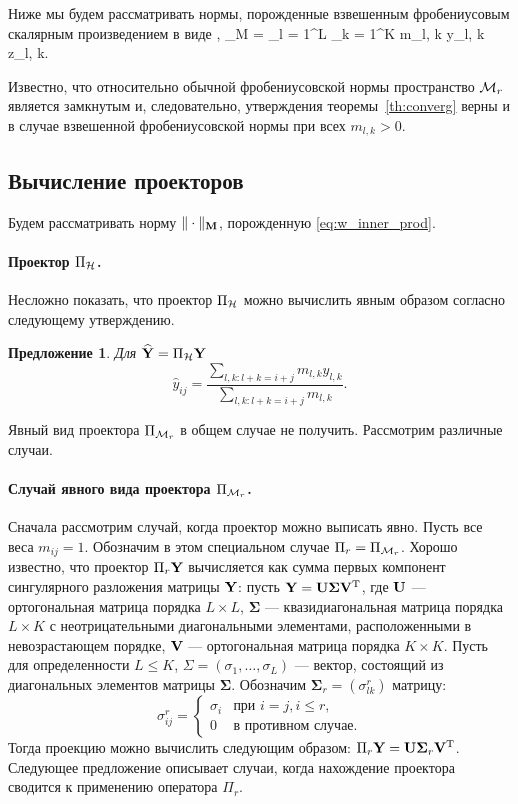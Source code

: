 \documentclass[12pt,a4paper,fleqn,leqno]{article}
\newtheorem{proposition}{Предложение}
\begin{document}
Ниже мы будем рассматривать нормы, порожденные взвешенным фробениусовым скалярным произведением в виде
\be
\label{eq:w_inner_prod}
\langle\bfY, \bfZ\rangle_M = \sum_{l = 1}^L \sum_{k = 1}^K m_{l, k} y_{l, k} z_{l, k}.
\ee

Известно, что относительно обычной фробениусовской нормы пространство $\mathcal{M}_r$ является замкнутым и, следовательно, утверждения теоремы~\ref{th:converg} верны и в случае взвешенной фробениусовской нормы при всех $m_{l,k} > 0$.


\subsection{Вычисление проекторов}

Будем рассматривать норму $\|\cdot\|_{\mathbf{M}}$, порожденную \eqref{eq:w_inner_prod}.

\paragraph{Проектор $\Pi_{\mathcal{H}}$.} Несложно показать, что проектор $\Pi_{\mathcal{H}}$
можно вычислить явным образом согласно следующему утверждению.

\begin{proposition}
Для $\widehat{\mathbf{Y}}=\Pi_{\mathcal{H}} \mathbf{Y}$
\begin{equation*}
\hat{y}_{ij} = \frac{\sum_{l,k: l+k=i+j} m_{l,k} y_{l,k}}{\sum_{l,k: l+k=i+j} m_{l,k}}.
\end{equation*}
\end{proposition}

Явный вид проектора $\Pi_{\mathcal{M}_r}$ в общем случае не получить.
Рассмотрим различные случаи.

\paragraph{Случай явного вида проектора $\Pi_{\mathcal{M}_r}$.} Сначала рассмотрим случай, когда проектор можно выписать явно.
Пусть все веса $m_{ij}=1$. Обозначим в этом специальном случае $\Pi_r=\Pi_{\mathcal{M}_r}$.
Хорошо известно, что проектор $\Pi_{r} \mathbf{Y}$
вычисляется как сумма первых компонент сингулярного разложения матрицы $\mathbf{Y}$: пусть $\mathbf{Y} = \mathbf{U} \mathbf{\Sigma} \mathbf{V}^{\mathrm{T}}$, где $\mathbf{U}$ --- ортогональная матрица порядка $L \times L$, $\mathbf{\Sigma}$ --- квазидиагональная матрица порядка $L \times K$ с неотрицательными диагональными элементами, расположенными в невозрастающем порядке, $\mathbf{V}$ --- ортогональная матрица порядка $K \times K$. Пусть для определенности $L\le K$, $\Sigma = (\sigma_1, \ldots, \sigma_L)$ --- вектор, состоящий из диагональных элементов матрицы $\mathbf{\Sigma}$. Обозначим $\mathbf{\Sigma}_r = (\sigma^r_{l k})$ матрицу:
\begin{equation*}
\sigma^r_{i j} = \begin{cases}
\sigma_i & \text{при $i = j, i \le r,$}\\
0 & \text{в противном случае}.
\end{cases}
\end{equation*}
Тогда проекцию можно вычислить следующим образом: $\Pi_{r} \mathbf{Y}  = \mathbf{U} \mathbf{\Sigma}_r \mathbf{V}^{\mathrm{T}}$.
Следующее предложение описывает случаи, когда нахождение проектора
сводится к применению оператора $\Pi_r$.
\end{document}
